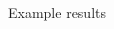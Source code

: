 \documentclass[aspectratio=169]{beamer}
\begin{document}
\begin{frame}{Example results}
	\begin{columns}
	\begin{column}{0.5\textwidth}
	\begin{figure}
	\end{figure}	
\end{column}
\begin{column}{0.5\textwidth}
	\begin{figure}
	\end{figure}		
\end{column}
\end{columns}
\end{frame}
\end{document}
